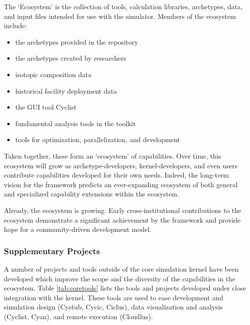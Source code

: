 The \Cyclus `Ecosystem' is the collection of tools, calculation libraries, 
archetypes, data, and input files intended for use with the \Cyclus simulator. 
Members of the ecosystem include:
\begin{itemize}
\item the archetypes provided in the \Cycamore \cite{carlsen_cycamore_2014} 
repository
\item the archetypes created by researchers
\item isotopic composition data
\item historical facility deployment data
\item the \Cyclus \gls{GUI} tool Cyclist
\item fundamental analysis tools in the \Cyclus toolkit
\item tools for \Cyclus optimization, parallelization, and development
\end{itemize}
Taken together, these form an `ecosystem' of capabilities. Over time, this 
ecosystem will grow as archetype-developers, kernel-developers, and 
even users contribute capabilities developed for their own needs. Indeed, the 
long-term vision for the \Cyclus framework predicts an ever-expanding ecosystem 
of both general and specialized capability extensions within the ecosystem. 

Already, the ecosystem is growing. Early cross-institutional contributions to 
the ecosystem demonstrate a significant achievement by the \Cyclus framework 
and provide hope for a community-driven development model. 

\subsubsection{Supplementary Projects}

A number of projects and tools outside of the core simulation kernel have been 
developed which improve the scope and the diversity of the capabilities in the \Cyclus 
ecosystem. Table \ref{tab:coretools} lists the tools and projects developed 
under close integration with the \Cyclus kernel.  These tools are used to ease development
and simulation design (Cystub, Cycic, Ciclus), data visualization and analysis (Cyclist, Cyan),
and remote execution (Cloudlus).

